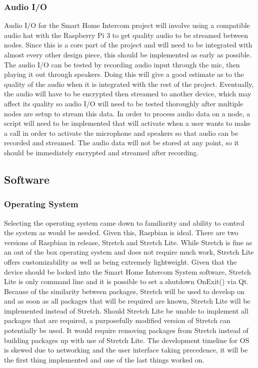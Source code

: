\documentclass[onecolumn, draftclsnofoot,10pt, compsoc]{IEEEtran}
\begin{document}
\subsubsection{Audio I/O}
Audio I/O for the Smart Home Intercom project will involve using a compatible audio hat with the Raspberry Pi 3 to get quality audio to be streamed between nodes. Since this is a core part of the project and will need to be integrated with almost every other design piece, this should be implemented as early as possible. The audio I/O can be tested by recording audio input through the mic, then playing it out through speakers. Doing this will give a good estimate as to the quality of the audio when it is integrated with the rest of the project. Eventually, the audio will have to be encrypted then streamed to another device, which may affect its quality so audio I/O will need to be tested thoroughly after multiple nodes are setup to stream this data. In order to process audio data on a node, a script will need to be implemented that will activate when a user wants to make a call in order to activate the microphone and speakers so that audio can be recorded and streamed. The audio data will not be stored at any point, so it should be immediately encrypted and streamed after recording.

\subsection{Software}
\subsubsection{Operating System}
Selecting the operating system came down to familiarity and ability to control the system as would be needed. Given this, Raspbian is ideal. There are two versions of Raspbian in release, Stretch and Stretch Lite. While Stretch is fine as an out of the box operating system and does not require much work, Stretch Lite offers customizability as well as being extremely lightweight. Given that the device should be locked into the Smart Home Intercom System software, Stretch Lite is only command line and it is possible to set a shutdown OnExit() via Qt. Because of the similarity between packages, Stretch will be used to develop on and as soon as all packages that will be required are known, Stretch Lite will be implemented instead of Stretch. Should Stretch Lite be unable to implement all packages that are required, a purposefully modified version of Stretch can potentially be used. It would require removing packages from Stretch instead of building packages up with use of Stretch Lite. The development timeline for OS is skewed due to networking and the user interface taking precedence, it will be the first thing implemented and one of the last things worked on.
\end{document}
